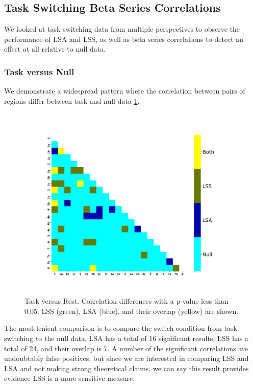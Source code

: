 \documentclass[10pt,letterpaper]{article}
\begin{document}
\subsection*{Task Switching Beta Series Correlations}
\label{results:bsc-taskswitch}

We looked at task switching data from multiple perspectives to
observe the performance of LSA and LSS, as well as beta series correlations
to detect an effect at all relative to null data.

\subsubsection*{Task versus Null}
\label{results:bsc-taskswitchXNull}

We demonstrate a widespread pattern where the correlation between pairs of
regions differ between task and null data \ref{fig:taskvnull}.

\begin{figure}[H]
  \centering
  \includegraphics[width=\textwidth]{data-both_atlas-activation_contrast-taskXnull}
  \caption{
    Task versus Rest. Correlation differences with a p-value less than 0.05.
    LSS (green), LSA (blue), and their overlap (yellow) are shown.
  }
  \label{fig:taskvnull}
\end{figure}

The most lenient comparison is to compare the switch condition from task switching to the null data.
LSA has a total of 16 significant results, LSS has a total of 24,
and their overlap is 7.
A number of the significant correlations are undoubtably false positives, but
since we are interested in comparing LSS and LSA and not making strong theoretical claims,
we can say this result provides evidence LSS is a more sensitive measure.
\end{document}
